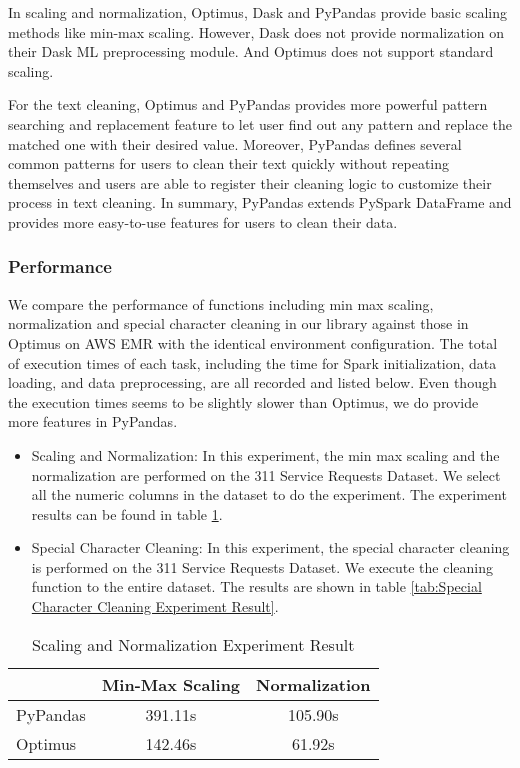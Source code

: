 \documentclass[sigconf]{acmart}
\begin{document}
In scaling and normalization, Optimus, Dask and PyPandas provide basic scaling methods like min-max scaling. However, Dask does not provide normalization on their Dask ML preprocessing module. And Optimus does not support standard scaling.

For the text cleaning, Optimus and PyPandas provides more powerful pattern searching and replacement feature to let user find out any pattern and replace the matched one with their desired value. Moreover, PyPandas defines several common patterns for users to clean their text quickly without repeating themselves and users are able to register their cleaning logic to customize their process in text cleaning. In summary, PyPandas extends PySpark DataFrame and provides more easy-to-use features for users to clean their data.

\subsubsection{Performance} We compare the performance of functions including min max scaling, normalization and special character cleaning in our library against those in Optimus on AWS EMR with the identical environment configuration. The total of execution times of each task, including the time for Spark initialization, data loading, and data preprocessing, are all recorded and listed below. Even though the execution times seems to be slightly slower than Optimus, we do provide more features in PyPandas.
\begin{itemize}
	\item{Scaling and Normalization}: In this experiment, the min max scaling and the normalization are performed on the 311 Service Requests Dataset. We select all the numeric columns in the dataset to do the experiment. The experiment results can be found in table \ref{tab:Scaling and Normalization Experiment Result}.
	\item{Special Character Cleaning}: In this experiment, the special character cleaning is performed on the 311 Service Requests Dataset. We execute the cleaning function to the entire dataset. The results are shown in table \ref{tab:Special Character Cleaning Experiment Result}.
\end{itemize}

\begin{table}
\caption{Scaling and Normalization Experiment Result}   
\label{tab:Scaling and Normalization Experiment Result}
\begin{tabular}{lcc}   
 	         &  Min-Max Scaling  &  Normalization \\
\hline
PyPandas   &  391.11s   & 105.90s  \\ 
Optimus     &  142.46s   & 61.92s   \\  
\end{tabular}   
\end{table}
\end{document}
